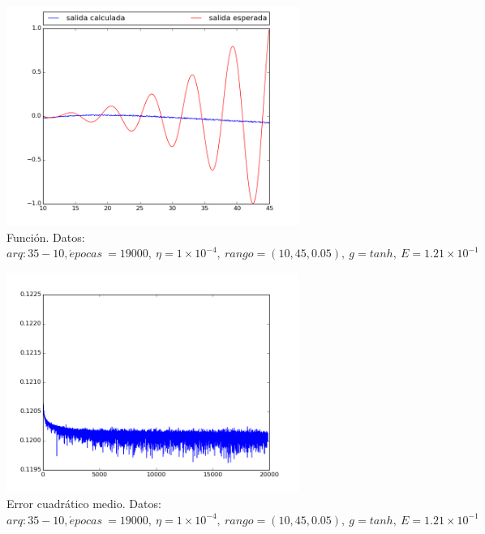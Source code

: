 \documentclass[12pt,a4paper]{article}
\begin{document}
\begin{figure}[H]
\centering
\includegraphics[width=0.85\textwidth]{img/_35_10-eta=00001-FUNCTION.png}
\caption{\label{fig:test4} Función. Datos:  $arq: 35-10, \acute{e} pocas \ =19000,\ \eta = 1 \times 10^{-4}, \ rango=(10, 45, 0.05),\ g=tanh, \ E = 1.21 \times 10^{-1}$}
\end{figure}

\begin{figure}[H]
\centering
\includegraphics[width=0.85\textwidth]{img/_35_10-eta=00001-ERROR.png}
\caption{\label{fig:test4err} Error cuadrático medio. Datos:  $arq: 35-10, \acute{e} pocas \ =19000,\ \eta = 1 \times 10^{-4}, \ rango=(10, 45, 0.05),\ g=tanh, \ E = 1.21 \times 10^{-1}$}
\end{figure}
\end{document}
